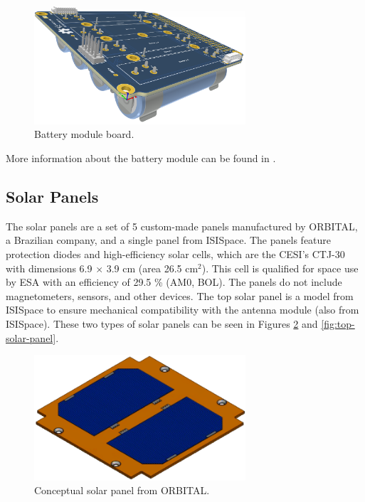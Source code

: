 \begin{figure}[!ht]
    \begin{center}
        \includegraphics[width=0.7\textwidth]{figures/bat2-pcb-3d}
        \caption{Battery module board.}
        \label{fig:battery-module-board}
    \end{center}
\end{figure}

More information about the battery module can be found in \cite{bat4c}.

\subsection{Solar Panels}

The solar panels are a set of 5 custom-made panels manufactured by ORBITAL, a Brazilian company, and a single panel from ISISpace. The panels feature protection diodes and high-efficiency solar cells, which are the CESI's CTJ-30 \cite{ctj30} with dimensions 6.9 $\times$ 3.9 cm (area 26.5 cm$^{2}$). This cell is qualified for space use by ESA with an efficiency of 29.5 \% (AM0, BOL). The panels do not include magnetometers, sensors, and other devices. The top solar panel is a model from ISISpace to ensure mechanical compatibility with the antenna module (also from ISISpace). These two types of solar panels can be seen in Figures \ref{fig:solar-panel-orbital} and \ref{fig:top-solar-panel}.

\begin{figure}[!ht]
    \begin{center}
        \includegraphics[width=0.7\textwidth]{figures/orbital-solar-panel}
        \caption{Conceptual solar panel from ORBITAL.}
        \label{fig:solar-panel-orbital}
    \end{center}
\end{figure}

